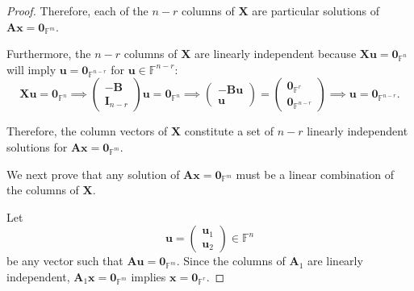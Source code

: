 \documentclass[a4paper,12pt]{report}
\begin{document}
\begin{proof}
Therefore, each of the \(n-r\) columns of \(\mathbf{X}\) are particular solutions of \(\mathbf{Ax} = \mathbf{0}_{\mathbb{F}^m}\).

Furthermore, the \(n-r\) columns of \(\mathbf{X}\) are linearly independent because \(\mathbf{Xu} = \mathbf{0}_{\mathbb{F}^n}\) will imply \(\mathbf{u} = \mathbf{0}_{\mathbb{F}^{n-r}}\) for \(\mathbf{u} \in \mathbb{F}^{n-r}\):
\[\mathbf{X}\mathbf{u} = \mathbf{0}_{\mathbb{F}^n} \implies \begin{pmatrix}
-\mathbf{B} \\
 \mathbf{I}_{n-r}
\end{pmatrix}\mathbf{u} = \mathbf{0}_{\mathbb{F}^n} \implies \begin{pmatrix}
-\mathbf{B}\mathbf{u} \\
 \mathbf{u}
\end{pmatrix} = \begin{pmatrix}
\mathbf{0}_{\mathbb{F}^r} \\
 \mathbf{0}_{\mathbb{F}^{n-r}}
\end{pmatrix} \implies \mathbf{u} = \mathbf{0}_{\mathbb{F}^{n-r}}.\]

Therefore, the column vectors of \(\mathbf{X}\) constitute a set of \(n-r\) linearly independent solutions for \(\mathbf{Ax} = \mathbf{0}_{\mathbb{F}^m}\).

We next prove that any solution of \(\mathbf{Ax} = \mathbf{0}_{\mathbb{F}^m}\) must be a linear combination of the columns of \(\mathbf{X}\).

Let
\[\mathbf{u} = \begin{pmatrix}
 \mathbf{u}_1 \\
 \mathbf{u}_2
\end{pmatrix} \in \mathbb{F}^n\]
be any vector such that \(\mathbf{Au} = \mathbf{0}_{\mathbb{F}^m}\). Since the columns of \(\mathbf{A}_1\) are linearly independent, \(\mathbf{A}_1\mathbf{x} = \mathbf{0}_{\mathbb{F}^m}\) implies \(\mathbf{x} = \mathbf{0}_{\mathbb{F}^r}\).


\end{proof}
\end{document}
